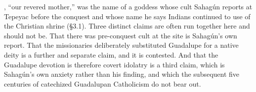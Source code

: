 , ``our revered mother,'' was the name of a goddess
whose cult Sahag\'un reports at Tepeyac before the conquest and whose
name he says Indians continued to use of the Christian shrine
(\S3.1). Three distinct claims are often run together here and should
not be. That there was pre-conquest cult at the site is Sahag\'un's
own report. That the missionaries deliberately substituted Guadalupe
for a native deity is a further and separate claim, and it is
contested. And that the Guadalupe devotion is therefore covert
idolatry is a third claim, which is Sahag\'un's own anxiety rather
than his finding, and which the subsequent five centuries of
catechized Guadalupan Catholicism do not
bear out.
